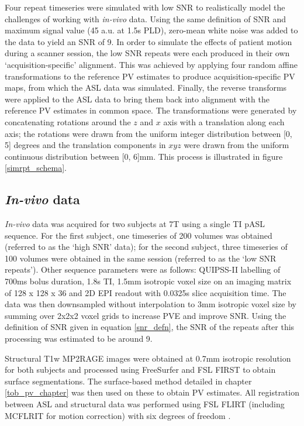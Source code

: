 Four repeat timeseries were simulated with low SNR to realistically model the challenges of working with \textit{in-vivo} data. Using the same definition of SNR and maximum signal value (45 a.u. at 1.5s PLD), zero-mean white noise was added to the data to yield an SNR of 9. In order to simulate the effects of patient motion during a scanner session, the low SNR repeats were each produced in their own `acquisition-specific' alignment. This was achieved by applying four random affine transformations to the reference PV estimates to produce acquisition-specific PV maps, from which the ASL data was simulated. Finally, the reverse transforms were applied to the ASL data to bring them back into alignment with the reference PV estimates in common space. The transformations were generated by concatenating rotations around the $z$ and $x$ axis with a translation along each axis; the rotations were drawn from the uniform integer distribution between [0, 5] degrees and the translation components in $xyz$ were drawn from the uniform continuous distribution between [0, 6]mm. This process is illustrated in figure \ref{simrpt_schema}. 

\subsection{\textit{In-vivo} data}

\textit{In-vivo} data was acquired for two subjects at 7T using a single TI pASL sequence. For the first subject, one timeseries of 200 volumes was obtained (referred to as the `high SNR' data); for the second subject, three timeseries of 100 volumes were obtained in the same session (referred to as the `low SNR repeats'). Other sequence parameters were as follows: QUIPSS-II labelling of 700ms bolus duration, 1.8s TI, 1.5mm isotropic voxel size on an imaging matrix of 128 x 128 x 36 and 2D EPI readout with 0.0325s slice acquisition time. The data was then downsampled without interpolation to 3mm isotropic voxel size by summing over 2x2x2 voxel grids to increase PVE and improve SNR. Using the definition of SNR given in equation \ref{snr_defn}, the SNR of the repeats after this processing was estimated to be around 9. 

Structural T1w MP2RAGE images were obtained at 0.7mm isotropic resolution for both subjects and processed using FreeSurfer and FSL FIRST to obtain surface segmentations. The surface-based method detailed in chapter \ref{tob_pv_chapter} was then used on these to obtain PV estimates. All registration between ASL and structural data was performed using FSL FLIRT (including MCFLRIT for motion correction) with six degrees of freedom \cite{flirt}. 

